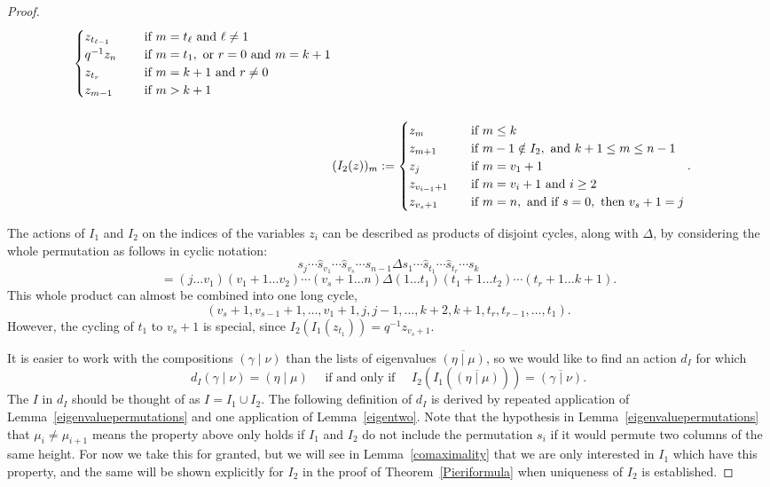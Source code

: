\documentclass[ALCO]{cedram}
\newcommand{\shatproduct}{s_1 \dotsm \widehat{s}_{t_1} \dotsm \widehat{s}_{t_r} \dotsm s_k}
\newcommand{\gammanu}{{(\gamma \mid \nu)}}
\newcommand{\dI}{d_I}
\begin{document}
\begin{proof}
\begin{align}
\begin{cases}
z_{t_{\ell-1}} \hspace*{.5cm} &\text{ if } m=t_\ell \text{ and } \ell \neq 1\\
q^{-1} z_n &\text{ if } m=t_1, \text{ or } r=0 \text{ and }m=k+1 \\
z_{t_r} &\text{ if } m=k+1 \text{ and } r\neq 0\\
z_{m-1} &\text{ if } m > k+1 \end{cases}\\[5mm]
\label{Itwo}& (I_2(z))_m := \begin{cases} z_m  &\text{ if } m\leq k \\
z_{m+1} \hspace*{.5cm} &\text{ if } m-1 \notin I_2, \text{ and } k+1 \leq m \leq n-1\\
z_{j} &\text{ if } m=v_1+1\\
z_{v_{i-1}+1} &\text{ if } m=v_i+1 \text{ and } i \geq 2\\
z_{v_s +1} &\text{ if } m=n, \text{ and if } s=0, \text{ then } v_s+1=j \end{cases}.\end{align}




The actions of $I_1$ and $I_2$ on the indices of the variables $z_i$ can be described as products of disjoint cycles, along with $\Delta$, by considering the whole permutation as follows in cyclic notation:
\[ s_j \dotsm \widehat{s}_{v_1} \dotsm \widehat{s}_{v_s} \dotsm s_{n-1}\Delta \shatproduct \]
\[ = (j \dots v_1) (v_1+1 \dots v_2) \dotsm (v_s+1 \dots n) \Delta (1 \dots t_1) (t_1+1 \dots t_2) \dotsm (t_r+1 \dots k+1).\]
This whole product can almost be combined into one long cycle,
\[ (v_s+1, v_{s-1}+1, \dots, v_1+1, j, j-1, \dots, k+2, k+1, t_r, t_{r-1}, \dots, t_1).\]
However, the cycling of $t_1$ to $v_s+1$ is special, since $I_2(I_1(z_{t_1})) = q^{-1} z_{v_s+1}$.

It is easier to work with the compositions $\gammanu$ than the lists of eigenvalues $\overline{(\eta \mid \mu)}$, so we would like to find an action $\dI$ for which 
\[\dI \gammanu=(\eta \mid \mu) \quad \text{ if and only if } \quad  I_2\left(I_1\left(\overline{(\eta \mid \mu)}\right) \right) = \overline{\gammanu}.\] The $I$ in $\dI$ should be thought of as $I = I_1 \cup I_2$. The following definition of $d_I$ is derived by repeated application of Lemma~\ref{eigenvaluepermutations} and one application of Lemma~\ref{eigentwo}. Note that the hypothesis in Lemma~\ref{eigenvaluepermutations} that $\mu_i \neq \mu_{i+1}$ means the property above only holds if $I_1$ and $I_2$ do not include the permutation $s_i$ if it would permute two columns of the same height. For now we take this for granted, but we will see in Lemma~\ref{comaximality} that we are only interested in $I_1$ which have this property, and the same will be shown explicitly for $I_2$ in the proof of Theorem~\ref{Pieriformula} when uniqueness of $I_2$ is established.


\end{proof}
\end{document}
